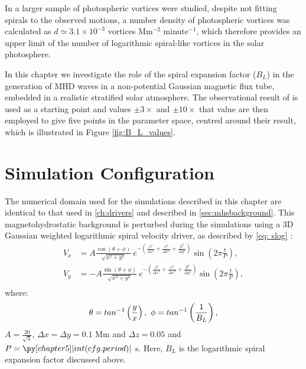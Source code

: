 In \cite{bonet2010} a larger sample of photospheric vortices were studied, despite not fitting spirals to the observed motions, a number density of photospheric vortices was calculated as $d \simeq 3.1 \times 10^{-3}$ vortices Mm$^{-2}$ minute$^{-1}$, which therefore provides an upper limit of the number of logarithmic spiral-like vortices in the solar photosphere.

In this chapter we investigate the role of the spiral expansion factor ($B_L$) in the generation of MHD waves in a non-potential Gaussian magnetic flux tube, embedded in a realistic stratified solar atmosphere.
The observational result of \cite{bonet2008} is used as a starting point and values $\pm 3\times$ and $\pm 10\times$ that value are then employed to give five points in the parameter space, centred around their result, which is illustrated in Figure \ref{fig:B_L_values}.


\section{Simulation Configuration}\label{sec:simconfig}
The numerical domain used for the simulations described in this chapter are identical to that used in \cref{ch:drivers} and described in \cref{sec:mhsbackground}.
This magnetohydrostatic background is perturbed during the simulations using a 3D Gaussian weighted logarithmic spiral velocity driver, as described by \cref{eq: slog} \citep{mumford2015}:
\begin{subequations}
    \begin{align}
    V_x &= A \frac{\cos(\theta + \phi)}{\sqrt{x^2 + y^2}}\ e^{-\left(\frac{z^2}{\Delta z^2} + \frac{x^2}{\Delta x^2} + \frac{y^2}{\Delta y^2}\right)} \sin \left(2\pi \frac{t}{P}\right),\\
    V_y &= - A \frac{\sin(\theta + \phi)}{\sqrt{x^2 + y^2}}\ e^{-\left(\frac{z^2}{\Delta z^2} + \frac{x^2}{\Delta x^2} + \frac{y^2}{\Delta y^2}\right)} \sin \left(2\pi \frac{t}{P}\right),\label{eq:Slog}\\
    \end{align}
    \label{eq: slog}
\end{subequations}
where:
\begin{equation*}
\theta = tan^{-1}\left(\frac{y}{x}\right),\ \phi = tan^{-1}\left(\frac{1}{B_L}\right),\notag	
\end{equation*}
$A=\frac{20}{\sqrt{3}}$, $\Delta x = \Delta y = 0.1$ Mm and $\Delta z = 0.05$ and $P=\py[chapter5]|int(cfg.period)|$ s.
Here, $B_L$ is the logarithmic spiral expansion factor discussed above.

